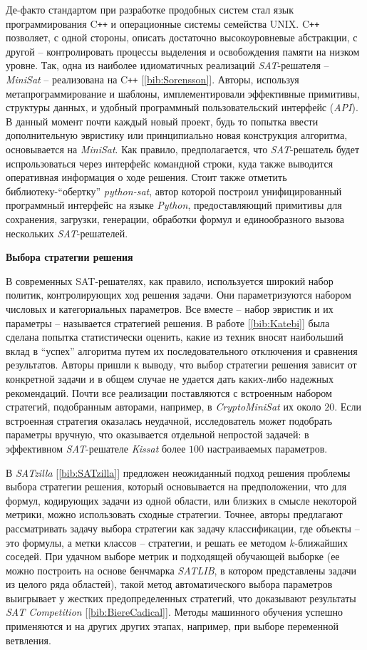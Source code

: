 Де-факто стандартом при разработке продобных систем стал язык программирования C\texttt{++} и операционные системы семейства UNIX.
C\texttt{++} позволяет, с одной стороны, описать достаточно высокоуровневые абстракции, с другой -- контролировать процессы выделения и освобождения памяти на низком уровне. Так, одна из наиболее идиоматичных реализаций \textit{SAT}-решателя -- \textit{MiniSat} -- реализована на C\texttt{++} [\ref{bib:Sorensson}]. Авторы, используя метапрограммирование и шаблоны, имплементировали эффективные примитивы, структуры данных, и удобный программный пользовательский интерфейс (\textit{API}). В данный момент почти каждый новый проект, будь то попытка ввести дополнительную эвристику или принципиально новая конструкция алгоритма, основывается на \textit{MiniSat}. Как правило, предполагается, что \textit{SAT}-решатель будет испрользоваться через интерфейс командной строки, куда также выводится оперативная информация о ходе решения. Стоит также отметить библиотеку-\enquote{обертку} \textit{python-sat}, автор которой построил унифицированный программный интерфейс на языке \textit{Python}, предоставляющий примитивы для сохранения, загрузки, генерации, обработки формул и единообразного вызова нескольких \textit{SAT}-решателей.

\textbf{Выбора стратегии решения}

В современных SAT-решателях, как правило, используется широкий набор политик, контролирующих ход решения задачи. Они параметризуются набором числовых и категориальных параметров. Все вместе -- набор эвристик и их параметры -- называется стратегией решения. В работе [\ref{bib:Katebi}] была сделана попытка статистически оценить, какие из техник вносят наибольший вклад в \enquote{успех} алгоритма путем их последовательного отключения и сравнения результатов. Авторы пришли к выводу, что выбор стратегии решения зависит от конкретной задачи и в общем случае не удается дать каких-либо надежных рекомендаций. Почти все реализации поставляются с встроенным набором стратегий, подобранным авторами, 
например, в \textit{CryptoMiniSat} их около $20$. Если встроенная стратегия оказалась неудачной, исследователь может подобрать параметры вручную, что оказывается отдельной непростой задачей: в эффективном \textit{SAT}-решателе \textit{Kissat} более $100$ настраиваемых параметров.

В \textit{SATzilla} [\ref{bib:SATzilla}] предложен неожиданный подход решения проблемы выбора стратегии решения, который основывается на предположении, что для формул, кодирующих задачи из одной области, или близких в смысле некоторой метрики, можно использовать сходные стратегии. Точнее, авторы предлагают рассматривать задачу выбора стратегии как задачу классификации, где объекты -- это формулы, а метки классов -- стратегии, и решать ее методом $k$-ближайших соседей. При удачном выборе метрик и подходящей обучающей выборке (ее можно построить на основе бенчмарка \textit{SATLIB}, в котором представлены задачи из целого ряда областей), такой метод автоматического выбора параметров выигрывает у жестких предопределенных стратегий, что доказывают результаты \textit{SAT Competition} [\ref{bib:BiereCadical}]. 
Методы машинного обучения успешно применяются и на других других этапах, например, при выборе переменной ветвления.

